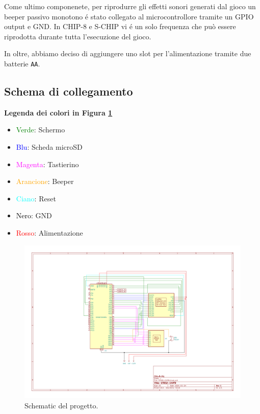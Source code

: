 \documentclass[a4paper]{article}
\begin{document}
Come ultimo componenete, per riprodurre gli effetti sonori generati dal gioco
un beeper passivo monotono é stato collegato al microcontrollore tramite un
GPIO output e GND. In CHIP-8 e S-CHIP vi é un solo frequenza che può
essere riprodotta durante tutta l'esecuzione del gioco.

In oltre, abbiamo deciso di aggiungere uno slot per l'alimentazione tramite
due batterie \texttt{AA}.

\subsection{Schema di collegamento}

\textbf{Legenda dei colori in Figura \ref{fig:schematic}}

\begin{itemize}
    \item \textcolor{green}{Verde}: Schermo
    \item \textcolor{blue}{Blu}: Scheda microSD
    \item \textcolor{magenta}{Magenta}: Tastierino
    \item \textcolor{orange}{Arancione}: Beeper
    \item \textcolor{cyan}{Ciano}: Reset
    \item \textcolor{black}{Nero}: GND
    \item \textcolor{red}{Rosso}: Alimentazione
\end{itemize}

\begin{figure}[h!t]
    \begin{center}
        \includegraphics[scale=0.50]{figures/STM32_CHIP8.pdf}
    \end{center}
    \caption{
        Schematic del progetto.
    }
    \label{fig:schematic}
\end{figure}
\end{document}
